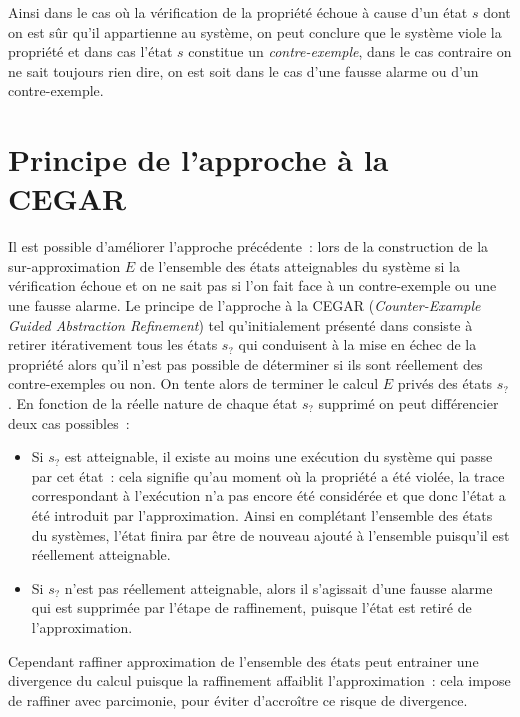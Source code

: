 
Ainsi dans le cas où la vérification de la propriété échoue à cause d'un état $s$ dont on est sûr
qu'il appartienne au système, on peut conclure que le système viole la propriété et dans cas 
l'état $s$ constitue un \emph{contre-exemple}, dans le cas contraire on ne sait toujours rien dire,
on est soit dans le cas d'une fausse alarme ou d'un contre-exemple.

\section{Principe de l'approche à la {CEGAR}}
Il est possible d'améliorer l'approche précédente~: lors de la construction de 
la sur-approximation $E$ de l'ensemble des états atteignables du système si la vérification échoue
et on ne sait pas si l'on fait face à un contre-exemple ou une une fausse alarme.
Le principe de l'approche à la {CEGAR} (\emph{Counter-Example Guided Abstraction Refinement})
tel qu'initialement présenté dans \cite{cegar00} consiste à retirer itérativement tous les
états $s_?$ qui conduisent à la mise en échec de la propriété alors qu'il n'est pas possible
de déterminer si ils sont réellement des contre-exemples ou non. On tente alors de terminer le calcul
$E$ privés des états $s_?$. En fonction de la réelle nature de chaque état $s_?$ supprimé on peut différencier
deux cas possibles~:

\begin{itemize}
\item
  Si $s_?$ est atteignable, il existe au moins une exécution du système qui passe par cet état~:
  cela signifie qu'au moment où la propriété a été violée, la trace correspondant à l'exécution
  n'a pas encore été considérée et que donc l'état a été introduit par l'approximation. Ainsi en 
  complétant l'ensemble des états du systèmes, l'état finira par être de nouveau ajouté à l'ensemble
  puisqu'il est réellement atteignable.

\item
  Si $s_?$ n'est pas réellement atteignable, alors il s'agissait d'une fausse alarme qui est supprimée
  par l'étape de raffinement, puisque l'état est retiré de l'approximation.

\end{itemize}

Cependant raffiner approximation de l'ensemble des états peut entrainer une divergence du calcul
puisque la raffinement affaiblit l'approximation~: cela impose de raffiner avec parcimonie, pour
éviter d'accroître ce risque de divergence.

